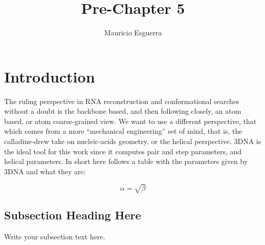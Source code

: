 \documentclass[10pt, oneside, pdftex]{article}
\begin{document}
\title{Pre-Chapter 5}
\author{Mauricio Esguerra}
\maketitle


\section{Introduction}
The  ruling  perspective  in  RNA  reconstruction  and  conformational
searches without  a doubt  is the backbone  based, and  then following
closely, an atom based, or atom coarse-grained view.  We want to use a
different  perspective,  that which  comes  from  a more  ``mechanical
engineering''   set    of   mind,   that    is,   the   calladine-drew
\cite{elhassan1995}  take  on nucleic-acids  geometry,  or the  helical
perspective. 3DNA  is the ideal tool  for this work  since it computes
pair  and  step parameters,  and  helical  parameters.  In short  here
follows a table with the parameters given by 3DNA and what they are:


\begin{equation}
    \label{simple_equation}
    \alpha = \sqrt{ \beta }
\end{equation}

\subsection{Subsection Heading Here}
Write your subsection text here.


	
\end{document}
